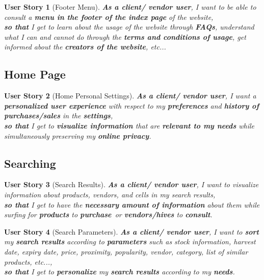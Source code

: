 \documentclass[a4paper,12pt]{book}
\theoremstyle{break}
\newtheorem{userStory}{User Story}
\theoremstyle{break}
\theoremstyle{break}
\theoremstyle{break}
\theoremstyle{definition}
\theoremstyle{remark}
\begin{document}
\begin{userStory}[Footer Menu]
\textbf{As a {\color{green} client}/{\color{red} vendor} user}, I want to be able to consult a \textbf{menu in the footer of the index page} of the website,\\
\indent
\textbf{so that} I get to learn about the usage of the website through \textbf{FAQs}, understand what I can and cannot do through the \textbf{terms and conditions of usage}, get informed about the \textbf{creators of the website}, \textit{etc...}
\end{userStory}

\subsection{Home Page}
\begin{userStory}[Home Personal Settings]
\textbf{As a {\color{green} client}/{\color{red} vendor} user}, I want a \textbf{personalized user experience} with respect to my \textbf{preferences} and \textbf{history of purchases/sales} in the \textbf{settings},\\
\indent
\textbf{so that} I get to \textbf{visualize information} that are \textbf{relevant to my needs} while simultaneously preserving my \textbf{online privacy}.
\end{userStory}

\subsection{Searching}
\begin{userStory}[Search Results]
\textbf{As a {\color{green} client}/{\color{red} vendor} user}, I want to visualize information about products, vendors, and cells in my search results,\\
\indent
\textbf{so that} I get to have the \textbf{necessary amount of information} about them while surfing for \textbf{products} to \textbf{purchase} or \textbf{vendors/hives} to \textbf{consult}.
\end{userStory}

\begin{userStory}[Search Parameters]
\textbf{As a {\color{green} client}/{\color{red} vendor} user}, I want to \textbf{sort} my \textbf{search results} according to \textbf{parameters} such as stock information, harvest date, expiry date, price, proximity, popularity, vendor, category, list of similar products, etc...,\\
\indent
\textbf{so that} I get to \textbf{personalize} my \textbf{search results} according to my \textbf{needs}.
\end{userStory}
\end{document}
